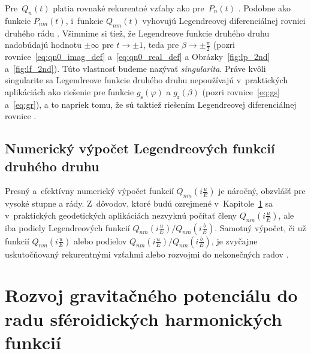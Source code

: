 \documentclass[a4paper,12pt]{book}
\begin{document}
Pre~$Q_n(t)$ platia rovnaké rekurentné vzťahy ako pre~$P_n(t)$ 
\parencite{MoritzPhysicalGeodesy}.  Podobne ako funkcie $P_{nm}(t)$, i~funkcie 
$Q_{nm}(t)$ vyhovujú Legendreovej diferenciálnej rovnici druhého rádu 
\parencite[pozri rovnicu
\ref{eq:legfunc1_differential_equation};][]{MoritzPhysicalGeodesy}.  Všimnime 
si tiež, že Legendreove funkcie druhého druhu nadobúdajú hodnotu $\pm \infty$ 
pre $t \rightarrow \pm 1$, teda pre $\beta \rightarrow \pm \frac{\pi}{2}$ 
(pozri rovnice~\ref{eq:qn0_imag_def} a~\ref{eq:qn0_real_def} 
a Obrázky~\ref{fig:lp_2nd} a~\ref{fig:lf_2nd}).  Túto vlastnosť budeme nazývať 
\emph{singularita}.  Práve kvôli singularite sa Legendreove funkcie druhého 
druhu nepoužívajú v~praktických aplikáciách ako riešenie pre funkcie 
$g_\mathrm{s}(\varphi)$ a $g_\mathrm{r}(\beta)$ (pozri rovnice~\ref{eq:gs} 
a~\ref{eq:gr}), a to napriek tomu, že sú taktiež riešením Legendreovej 
diferenciálnej rovnice \parencite{MoritzPhysicalGeodesy}.


\subsection{Numerický výpočet Legendreových funkcií druhého druhu}

Presný a~efektívny numerický výpočet funkcií $Q_{nm}\left( i \frac{u}{E} 
\right)$ je náročný, obzvlášť pre vysoké stupne a rády.  Z~dôvodov, ktoré budú 
ozrejmené v~Kapitole~\ref{sec:spheroidal_harmonic_expansion} sa v~praktických 
geodetických aplikáciách nezvyknú počítať členy $Q_{nm}\left( i \frac{u}{E} 
\right)$, ale iba podiely Legendreových funkcií $Q_{nm}\left( i \frac{u}{E} 
\right) \slash Q_{nm}\left( i \frac{b}{E} \right)$.  Samotný výpočet, či už 
funkcií $Q_{nm}\left( i \frac{u}{E} \right)$ alebo podielov $Q_{nm}\left( 
i \frac{u}{E} \right) \slash Q_{nm}\left( i \frac{b}{E} \right)$, je zvyčajne 
uskutočňovaný rekurentnými vzťahmi alebo rozvojmi do nekonečných radov 
\parencite[pozri napríklad][]{Sebera2012,Fukushima2013,Wang2013,Sprlak2020}.



\section{Rozvoj gravitačného potenciálu do radu sféroidických harmonických 
funkcií}
\label{sec:spheroidal_harmonic_expansion}
\end{document}
